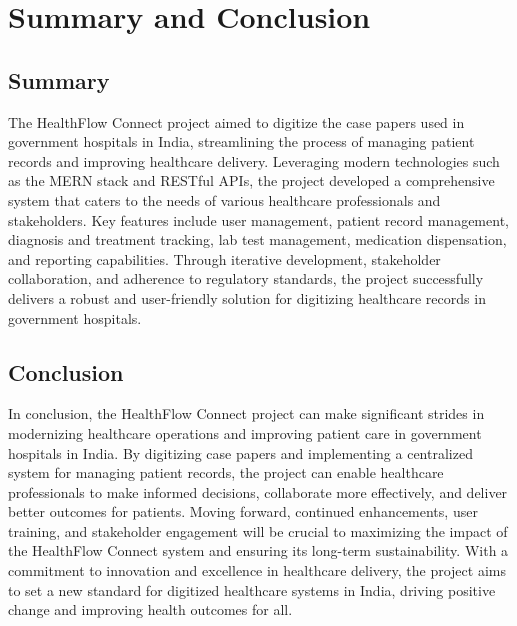 \chapter{Summary and Conclusion}
\section{Summary}

The HealthFlow Connect project aimed to digitize the case papers used in government hospitals in India, streamlining the process of managing patient records and improving healthcare delivery. Leveraging modern technologies such as the MERN stack and RESTful APIs, the project developed a comprehensive system that caters to the needs of various healthcare professionals and stakeholders. Key features include user management, patient record management, diagnosis and treatment tracking, lab test management, medication dispensation, and reporting capabilities. Through iterative development, stakeholder collaboration, and adherence to regulatory standards, the project successfully delivers a robust and user-friendly solution for digitizing healthcare records in government hospitals.

\section{Conclusion}

In conclusion, the HealthFlow Connect project can make significant strides in modernizing healthcare operations and improving patient care in government hospitals in India. By digitizing case papers and implementing a centralized system for managing patient records, the project can enable healthcare professionals to make informed decisions, collaborate more effectively, and deliver better outcomes for patients. Moving forward, continued enhancements, user training, and stakeholder engagement will be crucial to maximizing the impact of the HealthFlow Connect system and ensuring its long-term sustainability. With a commitment to innovation and excellence in healthcare delivery, the project aims to set a new standard for digitized healthcare systems in India, driving positive change and improving health outcomes for all.
